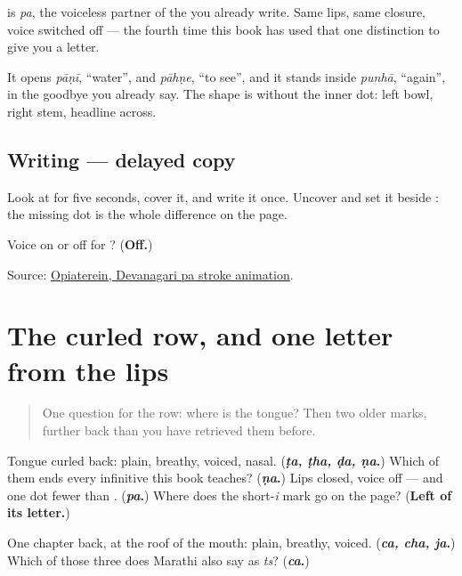 \textbf{} is \emph{pa}, the voiceless partner of the \textbf{} you already write. Same lips, same closure, voice switched off — the fourth time this book has used that one distinction to give you a letter.

It opens \emph{pāṇī}, \textquotedblleft{}water\textquotedblright{}, and \emph{pāhṇe}, \textquotedblleft{}to see\textquotedblright{}, and it stands inside \emph{punhā}, \textquotedblleft{}again\textquotedblright{}, in the goodbye you already say. The shape is \textbf{} without the inner dot: left bowl, right stem, headline across.

\subsection*{Writing — delayed copy}

Look at \textbf{} for five seconds, cover it, and write it once. Uncover and set it beside \textbf{}: the missing dot is the whole difference on the page.

\begin{tcolorbox}[breakable,colback=teal!4,colframe=teal!35!black,title={Before you move on}]
Voice on or off for \textbf{}? (\textbf{Off.})

Source: \href{https://commons.wikimedia.org/wiki/File:Deva-\%E0\%A4\%AA-order.gif}{Opiaterein, Devanagari pa stroke animation}.
\end{tcolorbox}
\section[curled row (vaḷlelī olī)]{The curled row, and one letter from the lips}

\label{lesson:MR-R07-retroflex-recall}



\begin{quote}
One question for the row: where is the tongue? Then two older marks, further back than you have retrieved them before.
\end{quote}

\begin{tcolorbox}[breakable,colback=teal!4,colframe=teal!35!black,title={Before you move on}]
Tongue curled back: plain, breathy, voiced, nasal. (\textbf{\emph{ṭa, ṭha, ḍa, ṇa}.}) Which of them ends every infinitive this book teaches? (\textbf{\emph{ṇa}.}) Lips closed, voice off — and one dot fewer than \textbf{}. (\textbf{\emph{pa}.}) Where does the short-\emph{i} mark go on the page? (\textbf{Left of its letter.})

One chapter back, at the roof of the mouth: plain, breathy, voiced. (\textbf{\emph{ca, cha, ja}.}) Which of those three does Marathi also say as \emph{ts}? (\textbf{\emph{ca}.})
\end{tcolorbox}
